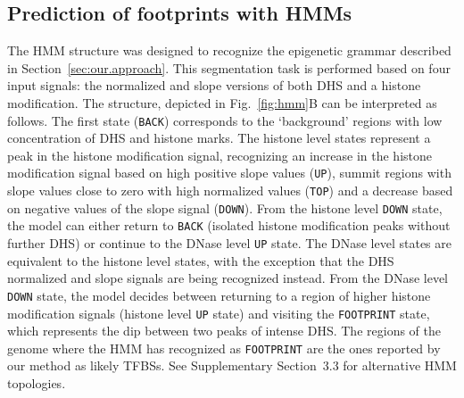 \documentclass{bioinfo}
\begin{document}
\begin{methods}
\subsection{Prediction of footprints with HMMs}
\label{sec:prediction.footprints}

The HMM structure was designed to recognize the epigenetic grammar
described in Section~\ref{sec:our.approach}. This segmentation task is
performed based on four input signals: the normalized and slope versions
of both DHS and a histone modification. The structure,
depicted in Fig.~\ref{fig:hmm}B can be interpreted as follows.
The first state ({\tt BACK}) corresponds to the `background' regions
with low concentration of DHS and histone marks. The
histone level states represent a peak in the histone modification signal,
recognizing an increase in the histone modification signal based on high positive
slope values ({\tt UP}), summit regions with slope
values close to zero with high normalized values ({\tt TOP}) and a
decrease based on negative values of the slope signal ({\tt DOWN}).
From the histone level {\tt DOWN} state, the model can either return
to {\tt BACK} (isolated histone modification peaks without further DHS) or continue
to the DNase level {\tt UP} state. The DNase
level states are equivalent to the histone level states, with the
exception that the DHS normalized and slope signals are being
recognized instead. From the DNase level {\tt DOWN} state, the model
decides between returning to a region of higher histone
modification signals (histone level {\tt UP} state) and visiting the
{\tt FOOTPRINT} state, which represents the dip between two peaks of
intense DHS. The regions of the genome where the HMM has
recognized as {\tt FOOTPRINT} are the ones reported by our method as
likely TFBSs. See Supplementary Section~3.3 for alternative HMM topologies.


\end{methods}
\end{document}
